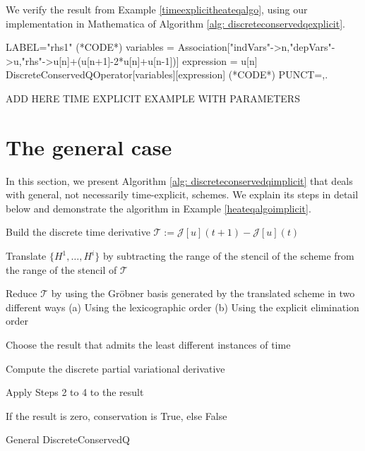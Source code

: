 \documentclass[runningheads]{llncs}
\newcommand{\Rr}{\mathbb{R}}
\newcommand{\Nn}{\mathbb{N}}
\newcommand{\1}{\chi}
\newcommand{\Ii}{\mathcal{I}}
\begin{document}
\begin{example}
	\label{heatex1}
	We verify the result from Example \ref{timeexplicitheateqalgo}, using our implementation in {\sc Mathematica} of Algorithm \ref{alg: discreteconservedqexplicit}.
	\begin{EXE}
		LABEL="rhs1"
		(*CODE*)
		variables = Association["indVars"->{n},"depVars"->{u},"rhs"->{u[n]+(u[n+1]-2*u[n]+u[n-1])}]
		expression = u[n]
		DiscreteConservedQOperator[variables][expression]
		(*CODE*)
		PUNCT={,.}
	\end{EXE}
	\begin{small}
		
		
	\end{small}
\end{example}

{\color{red}ADD HERE TIME EXPLICIT EXAMPLE WITH PARAMETERS} 



\section{The general case}
\label{secgen}
In this section, we present Algorithm \ref{alg: discreteconservedqimplicit} that deals with general, not necessarily time-explicit, schemes. We explain its steps in detail below and demonstrate the algorithm in Example \ref{heateqalgoimplicit}.
\begin{algorithm}
	\DontPrintSemicolon
	\KwIn{$\mathcal{J}\in\mathcal{F}(\mathcal{P}(\Ii\times\Nn,\Rr^m),\mathcal{D}(\Nn))$ and $\{H^1,\ldots,H^i\}\subset\mathcal{S}(\mathcal{P}(\Ii\times\Nn,\Rr^m),\mathcal{P}(\Ii\times\Nn,\Rr))$ }
	
	\label{step1} Build the discrete time derivative $\mathcal{T}:=\mathcal{J}[u](t+1)-\mathcal{J}[u](t)$\;
	
	\label{step2}Translate $\{H^1,\ldots,H^i\}$ by subtracting the range of the stencil of the scheme from the range of the stencil of $\mathcal{T}$\;
	
	\label{step3} Reduce $\mathcal{T}$ by using {\color{red} the Gr{\"o}bner basis} generated by the translated scheme in two different ways
	\label{step3a} (a) Using the lexicographic order
	\label{step3b} (b) Using the explicit elimination order\;
	
	\label{step4} Choose the result that admits the least different instances of time\;
	
	\label{step5} Compute the discrete partial variational derivative\;
	
	\label{step6} Apply Steps 2 to 4 to the result\;
	
	\label{step7} If the result is zero, conservation is {\sc True}, else {\sc False}\;
	
	\caption{{\sc General DiscreteConservedQ}}
	\label{alg: discreteconservedqimplicit}
\end{algorithm}
\end{document}
